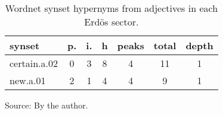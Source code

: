 \begin{table}[h!]
\begin{center}
\caption{Wordnet synset hypernyms from adjectives in each Erd\"os sector.}
	\label{tab:wnash}
\begin{tabular}{l || c | c | c || c | c | c}\hline
{\bf synset} & {\bf p.} & {\bf i.} & {\bf h} & {\bf peaks} & {\bf total} & {\bf depth} \\\hline\hline
certain.a.02 & 0  & 3  & 8  & 4  & 11  & 1 \\
new.a.01 & 2  & 1  & 4  & 4  & 9  & 1 \\\hline
\end{tabular}
\begin{flushleft}\footnotesize
		Source: By the author.\
\end{flushleft}
\end{center}
\end{table}
